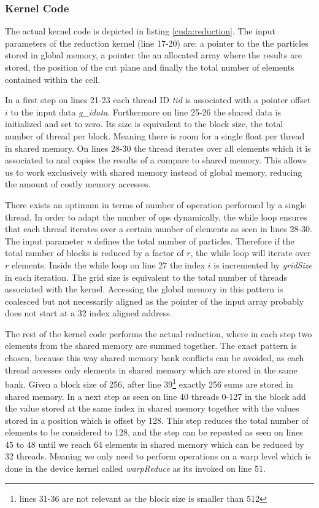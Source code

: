 \documentclass[]{article}
\begin{document}
\subsubsection{Kernel Code}\label{sec:countleftcode}
The actual kernel code is depicted in listing \ref{cuda:reduction}. The input parameters of the reduction kernel (line 17-20) are: a pointer to the the particles stored in global memory, a pointer the an allocated array where the results are stored, the position of the cut plane and finally the total number of elements contained within the cell.

In a first step on lines 21-23 each thread ID \textit{tid} is associated with a pointer offset $i$ to the input data \textit{g\_idata}. Furthermore on line 25-26 the shared data is initialized and set to zero. Its size is equivalent to the block size, the total number of thread per block. Meaning there is room for a single float per thread in shared memory. On lines 28-30 the thread iterates over all elements which it is associated to and copies the results of a compare to shared memory. This allows us to work exclusively with shared memory instead of global memory, reducing the amount of costly memory accesses.

There exists an optimum in terms of number of operation performed by a single thread. In order to adapt the number of ops dynamically, the while loop ensures that each thread iterates over a certain number of elements as seen in lines 28-30. The input parameter \textit{n} defines the total number of particles. Therefore if the total number of blocks is reduced by a factor of $r$, the while loop will iterate over $r$ elements. Inside the while loop on line 27 the index $i$ is incremented by \textit{gridSize} in each iteration. The grid size is equivalent to the total number of threads associated with the kernel. Accessing the global memory in this pattern is coalesced but not necessarily aligned as the pointer of the input array probably does not start at a 32 index aligned address. \cite{gMem} \cite{reduction}

The rest of the kernel code performs the actual reduction, where in each step two elements from the shared memory are summed together. The exact pattern is chosen, because this way shared memory bank conflicts can be avoided, as each thread accesses only elements in shared memory which are stored in the same bank. \cite{sharedMem} Given a block size of 256, after line 39\footnote{lines 31-36 are not relevant as the block size is smaller than 512} exactly 256 sums are stored in shared memory. In a next step as seen on line 40 threads 0-127 in the block add the value stored at the same index in shared memory together with the values stored in a position which is offset by 128. This step reduces the total number of elements to be considered to 128, and the step can be repeated as seen on lines 45 to 48 until we reach 64 elements in shared memory which can be reduced by 32 threads. Meaning we only need to perform operations on a warp level which is done in the device kernel called \textit{warpReduce} as its invoked on line 51. 
\end{document}
